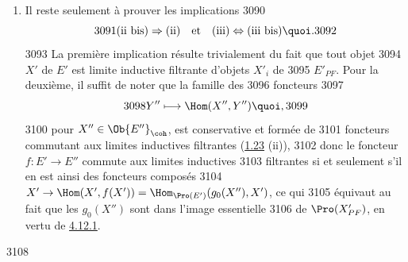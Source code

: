 \begin{enumerate}
  3066	Nous sommes donc amenés à prouver le
  3067	
  3068	\begin{enonce*}{Lemme 4.12.1}
  3069	Soient $E'$ un topos tel que la sous-catégorie $E'_{\coh}$ y soit
  3070	génératrice, et $X' \in \Ob \Pro(E')$. Pour que $X'$ appartienne à
  3071	l'image essentielle de $\Pro(E'_{PF})$, il faut et il suffit que le
  3072	foncteur $h : E'\to (\Ens)$ qu'il pro-représente commute aux limites
  3073	inductives filtrantes.
  3074	\end{enonce*}
  3075	
  3076	Comme une limite inductive filtrante de foncteurs commutant aux
  3077	limites inductives filtrantes possède la même propriété, la suffisance
  3078	résulte de la définition de $E'_{PF}$. Pour la nécessité, il faut
  3079	prouver que si le foncteur $h$ commute aux limites inductives
  3080	filtrantes, alors dans la catégorie filtrante $E'_{/h}$ des couples
  3081	$(X', u)$ avec $u \in h(X')$, la sous-catégorie formée des couples
  3082	$(X', u)$ avec $X'\in \Ob E'_{PF}$ est cofinale, \ie pour tout
  3083	$(X', u)$ dans $E'_{/h}$, il existe un morphisme $X'_{0} \to
  3084	X'$, avec $X'_{0} \in \Ob E'_{PF}$, tel que $u \in \text{Im}
  3085	(h(X'_0) \to h(X'))$.\pageoriginale Or on sait que $X'$ est limite inductive
  3086	filtrante d'objets $X'_i$ de $E'_{PF}$ (\hyperref[VI.cor1.24.2]{1.24.2} a)), donc $h(X')$
  3087	est limite inductive filtrante des $h(X'_i)$, d'où la conclusion.
  3088	
  3089	\item Il reste seulement à prouver les implications
  3090	$$
  3091	\text{(ii bis)} \Rightarrow \text{(ii)\quad et\quad  (iii)} \Leftrightarrow \text{(iii bis)}{\quoi}.
  3092	$$
  3093	La première implication résulte trivialement du fait que tout objet
  3094	$X'$ de $E'$ est limite inductive filtrante d'objets $X'_i$ de
  3095	$E'_{PF}$. Pour la deuxième, il suffit de noter que la famille des
  3096	foncteurs
  3097	$$
  3098	Y'' \longmapsto \Hom(X'', Y''){\quoi},
  3099	$$
  3100	pour $X'' \in \Ob {E''}_{\coh}$, est conservative et formée de
  3101	foncteurs commutant aux limites inductives filtrantes (\hyperref[VI.thm1.23]{1.23} (ii)),
  3102	donc le foncteur $f : E'\to E''$ commute aux limites inductives
  3103	filtrantes si et seulement s'il en est ainsi des foncteurs composés
  3104	$X'\to \Hom(X', f(X')) = \Hom_{\Pro(E')}(g_0 (X''), X')$, ce qui
  3105	équivaut au fait que les $g_0(X'')$ sont dans l'image essentielle
  3106	de $\Pro(X'_{PF})$, en vertu de \hyperref[VI.lem4.12.1]{4.12.1}. 	\end{enumerate}
  3108	
